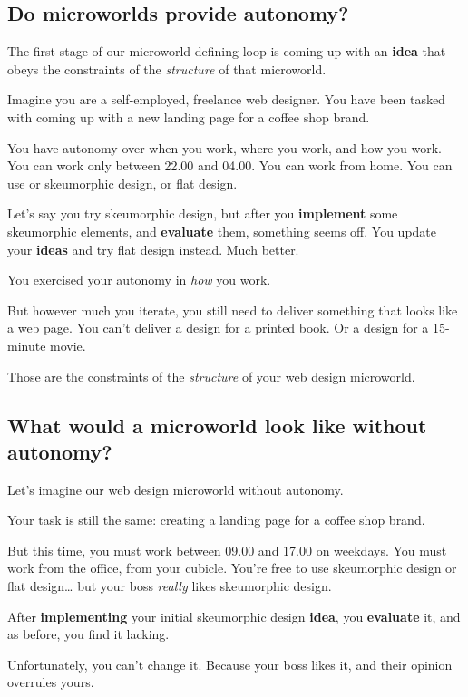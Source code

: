 \subsection{Do microworlds provide autonomy?}

The first stage of our microworld-defining loop is coming up with an
\textbf{idea} that obeys the constraints of the \emph{structure} of that
microworld.

Imagine you are a self-employed, freelance web designer. You have been
tasked with coming up with a new landing page for a coffee shop brand.

You have autonomy over when you work, where you work, and how you work.
You can work only between 22.00 and 04.00. You can work from home. You
can use or skeumorphic design, or flat design.

Let's say you try skeumorphic design, but after you \textbf{implement}
some skeumorphic elements, and \textbf{evaluate} them, something seems
off. You update your \textbf{ideas} and try flat design instead. Much
better.

You exercised your autonomy in \emph{how} you work.

But however much you iterate, you still need to deliver something that
looks like a web page. You can't deliver a design for a printed book. Or
a design for a 15-minute movie.

Those are the constraints of the \emph{structure} of your web design
microworld.

\subsection{What would a microworld look like without autonomy?}

Let's imagine our web design microworld without autonomy.

Your task is still the same: creating a landing page for a coffee shop
brand.

But this time, you must work between 09.00 and 17.00 on weekdays. You
must work from the office, from your cubicle. You're free to use
skeumorphic design or flat design\ldots{} but your boss \emph{really}
likes skeumorphic design.

After \textbf{implementing} your initial skeumorphic design
\textbf{idea}, you \textbf{evaluate} it, and as before, you find it
lacking.

Unfortunately, you can't change it. Because your boss likes it, and
their opinion overrules yours.

